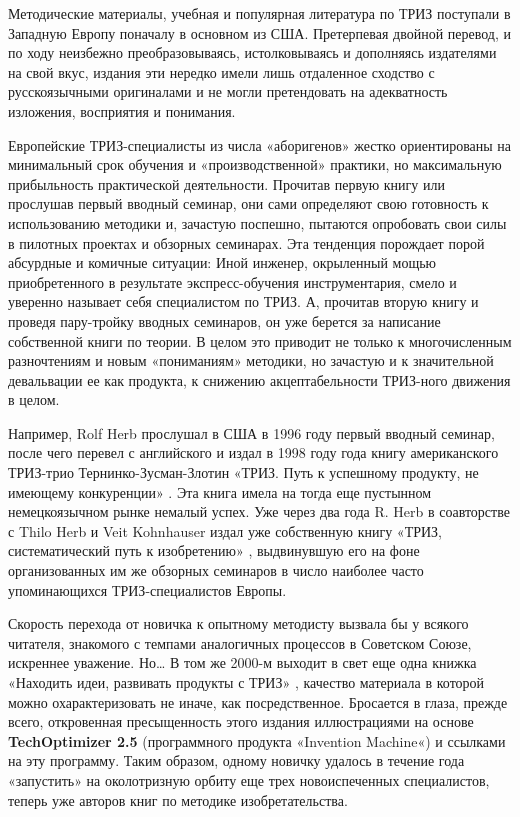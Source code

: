 \documentclass[11pt,a4paper]{article}
\begin{document}
Методические материалы, учебная и популярная литература по ТРИЗ поступали в
Западную Европу поначалу в основном из США. Претерпевая двойной перевод, и по
ходу неизбежно преобразовываясь, истолковываясь и дополняясь издателями на
свой вкус, издания эти нередко имели лишь отдаленное сходство с русскоязычными
оригиналами и не могли претендовать на адекватность изложения, восприятия и
понимания.

Европейские ТРИЗ-специалисты из числа «аборигенов» жестко ориентированы на
минимальный срок обучения и «производственной» практики, но максимальную
прибыльность практической деятельности. Прочитав первую книгу или прослушав
первый вводный семинар, они сами определяют свою готовность к использованию
методики и, зачастую поспешно, пытаются опробовать свои силы в пилотных
проектах и обзорных семинарах. Эта тенденция порождает порой абсурдные и
комичные ситуации: Иной инженер, окрыленный мощью приобретенного в результате
экспресс-обучения инструментария, смело и уверенно называет себя специалистом
по ТРИЗ. А, прочитав вторую книгу и проведя пару-тройку вводных семинаров, он
уже берется за написание собственной книги по теории. В целом это приводит не
только к многочисленным разночтениям и новым «пониманиям» методики, но
зачастую и к значительной девальвации ее как продукта, к снижению
акцептабельности ТРИЗ-ного движения в целом.

Например, Rolf Herb прослушал в США в 1996 году первый вводный семинар, после
чего перевел с английского и издал в 1998 году года книгу американского
ТРИЗ-трио Тернинко-Зусман-Злотин «ТРИЗ. Путь к успешному продукту, не имеющему
конкуренции» \cite{Terninko1998}.  Эта книга имела на тогда еще пустынном
немецкоязычном рынке немалый успех. Уже через два года R. Herb в соавторстве с
Thilo Herb и Veit Kohnhauser издал уже собственную книгу «ТРИЗ,
систематический путь к изобретению» \cite{Herb2000}, выдвинувшую его на фоне
организованных им же обзорных семинаров в число наиболее часто упоминающихся
ТРИЗ-специалистов Европы.

Скорость перехода от новичка к опытному методисту вызвала бы у всякого
читателя, знакомого с темпами аналогичных процессов в Советском Союзе,
искреннее уважение. Но… В том же 2000-м выходит в свет еще одна книжка
«Находить идеи, развивать продукты с ТРИЗ» \cite{Gimpel2000}, качество
материала в которой можно охарактеризовать не иначе, как
посредственное. Бросается в глаза, прежде всего, откровенная пресыщенность
этого издания иллюстрациями на основе \textbf{TechOptimizer 2.5} (программного
продукта «Invention Machine«) и ссылками на эту программу. Таким образом,
одному новичку удалось в течение года «запустить» на околотризную орбиту еще
трех новоиспеченных специалистов, теперь уже авторов книг по методике
изобретательства.
\end{document}
